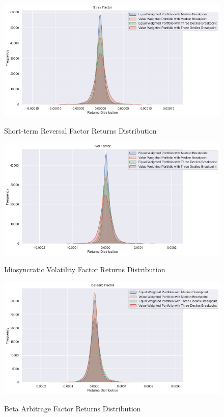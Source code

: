 \begin{figure}[H]
	\caption{Short-term Reversal Factor Returns Distribution}
	\centering
	\includegraphics[scale=.63]{../../output/figures/strev.png}
	\label{fig:strev}
\end{figure}

\begin{figure}[H]
	\caption{Idiosyncratic Volatility Factor Returns Distribution}
	\centering
	\includegraphics[scale=.63]{../../output/figures/ivol.png}
	\label{fig:ivol}
\end{figure}

\begin{figure}[H]
	\caption{Beta Arbitrage Factor Returns Distribution}
	\centering
	\includegraphics[scale=.63]{../../output/figures/betaarb.png}
	\label{fig:betaarb}
\end{figure}

